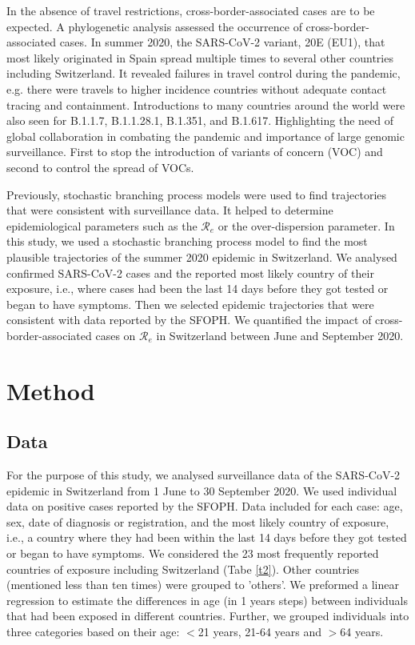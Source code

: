 \documentclass[10pt, a4paper, twoside]{article}
\begin{document}
\begin{multicols}{2}
In the absence of travel restrictions, cross-border-associated cases are to be expected.\cite{russell_effect_2021} 
A phylogenetic analysis assessed the occurrence of cross-border-associated cases.\cite{hodcroft_emergence_2020}
In summer 2020, the SARS-CoV-2 variant, 20E (EU1), that most likely originated in Spain spread multiple times to several other countries including Switzerland.\cite{hodcroft_emergence_2020}
It revealed failures in travel control during the pandemic, e.g. there were travels to higher incidence countries without adequate contact tracing and containment.\cite{hodcroft_emergence_2020}
Introductions to many countries around the world were also seen for B.1.1.7, B.1.1.28.1, B.1.351, and B.1.617.\cite{davies_estimated_2021,faria_genomics_2021,tegally_detection_2021,cherian_convergent_2021} 
Highlighting the need of global collaboration in combating the pandemic and importance of large genomic surveillance.
First to stop the introduction of variants of concern (VOC) and second to control the spread of VOCs.

Previously, stochastic branching process models were used to find trajectories that were consistent with surveillance data.\cite{althaus_ebola_2015,riou_pattern_2020}
It helped to determine epidemiological parameters such as the $\mathcal{R}_e$ or the over-dispersion parameter.\cite{althaus_ebola_2015,riou_pattern_2020}
In this study, we used a stochastic branching process model to find the most plausible trajectories of the summer 2020 epidemic in Switzerland.
We analysed confirmed SARS-CoV-2 cases and the reported most likely country of their exposure, i.e., where cases had been the last 14 days before they got tested or began to have symptoms.
Then we selected epidemic trajectories that were consistent with data reported by the SFOPH.
We quantified the impact of cross-border-associated cases on $\mathcal{R}_e$ in Switzerland between June and September 2020.

\section{Method}

\subsection{Data}
For the purpose of this study, we analysed surveillance data of the SARS-CoV-2 epidemic in Switzerland from 1 June to 30 September 2020. 
We used individual data on positive cases reported by the SFOPH. 
Data included for each case: age, sex, date of diagnosis or registration, and the most likely country of exposure, i.e., a country where they had been within the last 14 days before they got tested or began to have symptoms.
We considered the 23 most frequently reported countries of exposure including Switzerland (Tabe \ref{t2}).
Other countries (mentioned less than ten times) were grouped to 'others'.
We preformed a linear regression to estimate the differences in age (in 1 years steps) between individuals that had been exposed in different countries.
Further, we grouped individuals into three categories based on their age: $<$21 years, 21-64 years and  $>$64 years.


\end{multicols}
\end{document}
